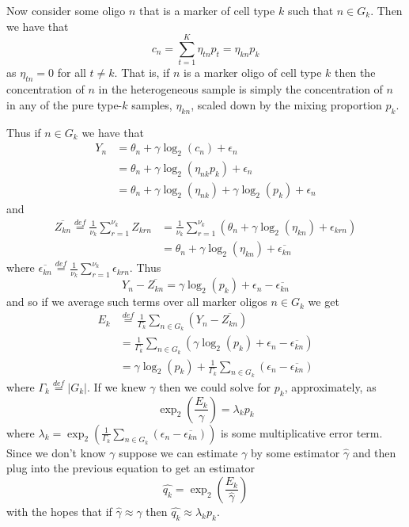 \documentclass[reqno,12pt,oneside]{report}\usepackage[]{graphicx}\usepackage[]{color}
\theoremstyle{plain}
\theoremstyle{definition}
\theoremstyle{remark}
\numberwithin{theorem}{chapter}     %
\begin{document}
Now consider some oligo $n$ that is a marker of cell type $k$ such that $n\in G_k$. Then we have that
\[
c_n = \sum_{t=1}^{K} \eta_{tn}p_t = \eta_{kn} p_k
\]
as $\eta_{tn}=0$ for all $t\neq k$.
That is, if $n$ is a marker oligo of cell type $k$ then the concentration of $n$ in the heterogeneous sample is simply the concentration of $n$ in any of the pure type-$k$ samples, $\eta_{kn}$, scaled down by the mixing proportion $p_k$.

Thus if $n\in G_k$ we have that 
\[
\begin{aligned}
  Y_n &=\theta_n + \gamma\log_2\left(c_n\right)+\epsilon_n\\
  &= \theta_n + \gamma\log_2\left(\eta_{nk}p_k\right)+\epsilon_n\\
  &= \theta_n + \gamma\log_2\left(\eta_{nk}\right)+\gamma\log_2\left(p_k\right)+\epsilon_n 
\end{aligned}
\]
and
\[
\begin{aligned}
  \overline{Z_{kn}}\overset{def}{=}\frac{1}{\nu_k}\sum_{r=1}^{\nu_k}Z_{krn} &= \frac{1}{\nu_k}\sum_{r=1}^{\nu_k}\left(\theta_n + \gamma \log_2\left(\eta_{kn}\right)+\epsilon_{krn}\right)\\
  &= \theta_n + \gamma \log_2\left(\eta_{kn}\right)+\overline{\epsilon_{kn}}
\end{aligned}
\]
where $\overline{\epsilon_{kn}} \overset{def}{=} \frac{1}{\nu_k}\sum_{r=1}^{\nu_k}\epsilon_{krn}$. Thus
\[
  Y_n - \overline{Z_{kn}} = \gamma\log_2\left(p_k\right)+\epsilon_n - \overline{\epsilon_{kn}}
\]
and so if we average such terms over all marker oligos $n\in G_k$ we get
\[
\begin{aligned}
E_k &\overset{def}{=} \frac{1}{\Gamma_k} \sum_{n\in G_k}\left(Y_n-\overline{Z_{kn}}\right)\\
&=\frac{1}{\Gamma_k} \sum_{n\in G_k} \left(\gamma\log_2\left(p_k\right)+\epsilon_n - \overline{\epsilon_{kn}}\right)\\
&=\gamma\log_2\left(p_k\right)+\frac{1}{\Gamma_k} \sum_{n\in G_k}\left(\epsilon_n - \overline{\epsilon_{kn}}\right)
\end{aligned}
\]
where $\Gamma_k \overset{def}{=} |G_k|$. If we knew $\gamma$ then we could solve for $p_k$, approximately, as
\[
\exp_2\left(\frac{E_k}{\gamma}\right) = \lambda_k p_k
\]
where $\lambda_k = \exp_2\left(\frac{1}{\Gamma_k} \sum_{n\in G_k}\left(\epsilon_n - \overline{\epsilon_{kn}}\right)\right)$ is some multiplicative error term. Since we don't know $\gamma$ suppose we can estimate $\gamma$ by some estimator $\widehat{\gamma}$ and then plug into the previous equation to get an estimator 
\[
\widehat{q_k} = \exp_2\left(\frac{E_k}{\widehat{\gamma}}\right)
\]
with the hopes that if $\widehat{\gamma}\approx\gamma$ then $\widehat{q_k}\approx \lambda_kp_k$.
\end{document}
